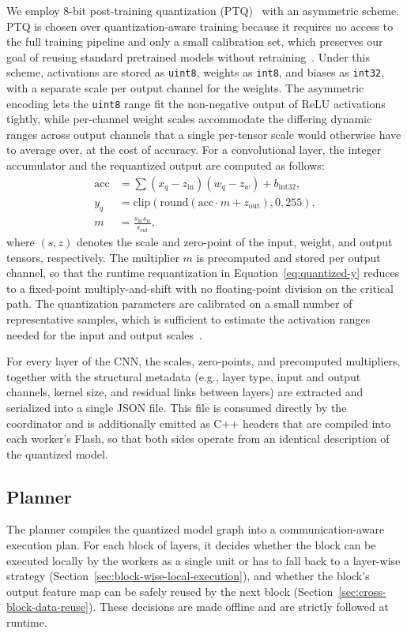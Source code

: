 We employ 8-bit post-training quantization (PTQ)~\cite{quantization-ptq} with an asymmetric scheme. PTQ is chosen over quantization-aware training because it requires no access to the full training pipeline and only a small calibration set, which preserves our goal of reusing standard pretrained models without retraining~\cite{quantization-qat}. 
Under this scheme, activations are stored as \verb|uint8|, weights as \verb|int8|, and biases as \verb|int32|, with a separate scale per output channel for the weights. 
The asymmetric encoding lets the \verb|uint8| range fit the non-negative output of ReLU activations tightly, while per-channel weight scales accommodate the differing dynamic ranges across output channels that a single per-tensor scale would otherwise have to average over, at the cost of accuracy. 
For a convolutional layer, the integer accumulator and the requantized output are computed as follows:
\begin{align}
    \mathrm{acc} &= \sum(x_q - z_{\mathrm{in}})(w_q-z_w)+b_{\mathrm{int32}}, \label{eq:quantized-acc}\\
    y_q &= \mathrm{clip}(\mathrm{round}(\mathrm{acc} \cdot m + z_{\mathrm{out}}), 0, 255), \label{eq:quantized-y}\\
    m &= \frac{s_{\mathrm{in}}s_w}{s_{\mathrm{out}}}, \label{eq:quantized-multiplier}
\end{align}
where $(s,z)$ denotes the scale and zero-point of the input, weight, and output tensors, respectively. 
The multiplier $m$ is precomputed and stored per output channel, so that the runtime requantization in Equation~\eqref{eq:quantized-y} reduces to a fixed-point multiply-and-shift with no floating-point division on the critical path. 
The quantization parameters are calibrated on a small number of representative samples, which is sufficient to estimate the activation ranges needed for the input and output scales~\cite{imagenet}.

For every layer of the CNN, the scales, zero-points, and precomputed multipliers, together with the structural metadata (e.g., layer type, input and output channels, kernel size, and residual links between layers) are extracted and serialized into a single JSON file. This file is consumed directly by the coordinator and is additionally emitted as C++ headers that are compiled into each worker's Flash, so that both sides operate from an identical description of the quantized model.

\subsection{Planner}
The planner compiles the quantized model graph into a communication-aware execution plan.
For each block of layers, it decides whether the block can be executed locally by the workers as a single unit or has to fall back to a layer-wise strategy (Section~\ref{sec:block-wise-local-execution}), and whether the block's output feature map can be safely reused by the next block (Section~\ref{sec:cross-block-data-reuse}).
These decisions are made offline and are strictly followed at runtime.

